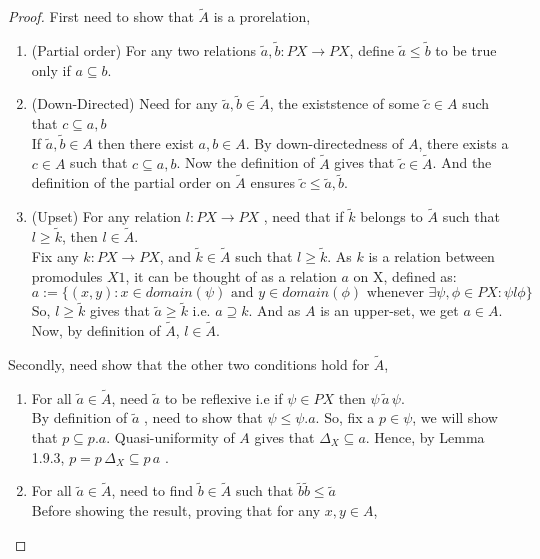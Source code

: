 \documentclass[18pt,a4paper]{article}
\makeatletter
\theoremstyle{definition}
\newcommand{\carrow}{}%
\DeclareRobustCommand{\carrow}{%
	\mathrel{\vphantom{\rightarrow}\mathpalette\circle@arrow\relax}%
}
\newcommand{\circle@arrow}[2]{%
	\m@th
	\ooalign{%
		\hidewidth$#1\circ\mkern1mu$\hidewidth\cr
	$#1\longrightarrow$\cr}%
}
\makeatother
\begin{document}
\begin{proof}
	First need to show that $\tilde{A}$ is a prorelation,
	\begin{enumerate}[label=(\roman*)]
		\item (Partial order) For any two relations $\tilde{a},\tilde{b}:PX \to PX $,
			define $ \tilde{a} \leq \tilde{b}$ to be true only if $a \subseteq b$.
		\item(Down-Directed) Need for any $\tilde{a} ,\tilde{b} \in \tilde{A}$,
			the existstence of some $\tilde{c} \in A$ such that $c \subseteq a,b$\\
			If $\tilde{a} ,\tilde{b} \in A$ then there exist $a,b \in A$. By down-directedness
			of $A$, there exists a $c \in A$ such that  $c \subseteq a,b$. Now the definition
			of $\tilde{A}$ gives that $\tilde{c} \in \tilde{A}$. And the definition of the
			partial order on $\tilde{A}$ ensures $\tilde{c} \leq \tilde{a} ,\tilde{b}$.
		\item (Upset) For any relation $l:PX \to PX$ , need that if  $\tilde{k}$ belongs to
			$\tilde{A}$ such that $l \geq \tilde{k}$, then $l \in \tilde{A}$.\\
			Fix any $k:PX \to PX$, and $\tilde{k} \in \tilde{A}$ such that $l\geq \tilde{k} $.
			As $k$ is a relation between promodules $X \carrow 1$, it can be thought
			of as a relation $a$ on X, defined as:
			\[a:=\{(x,y): x \in domain(\psi) \text{ and }y \in domain(\phi)
			\text{ whenever } \exists \psi,\phi \in PX: \psi l \phi\}\]
			So, $l\geq \tilde{k}$ gives that $\tilde{a}\geq \tilde{k}$ i.e. $a \supseteq k.$
			And as $A$ is an upper-set, we get $a\in A$. Now, by definition of $\tilde{A}$,
			$l \in \tilde{A}$.
	\end{enumerate}
	Secondly, need show that the other two conditions hold for $\tilde{A}$,
	\begin{enumerate}[label=(\roman*)]
		\item For all $\tilde{a} \in \tilde{A}$, need $\tilde{a}$ to be reflexive i.e
			if $\psi \in PX$ then $\psi \, \tilde{a} \, \psi$.\\
			By definition of $\tilde{a}$ , need to show that $\psi \leq \psi.a$.
			So, fix a $p \in \psi$, we will show that $p \subseteq p.a$.
			Quasi-uniformity of $A$ gives that $\Delta_X \subseteq a$. Hence, by Lemma 1.9.3,
			$p=p \, \Delta_X \subseteq p \,a$ .
		\item For all $\tilde{a} \in \tilde{A}$, need to find $\tilde{b}\in \tilde{A}$ such that
			$\tilde{b}\tilde{b} \leq \tilde{a} $\\
			Before showing the result, proving that for any $x,y \in A$,

\end{enumerate}
\end{proof}
\end{document}

